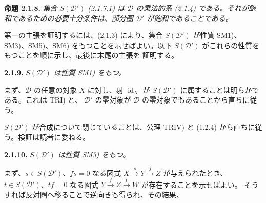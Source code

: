 \medskip
\noindent\textbf{命題 2.1.8.}\quad
{}
\emph{集合 $S(\mathcal D')$ (2.1.7.1) は $\mathcal D$ の乗法的系
(2.1.4) である。それが飽和であるための必要十分条件は、部分圏
$\mathcal D'$ が飽和であることである。}

第一の主張を証明するには、(2.1.3) により、集合 $S(\mathcal D')$ が性質
SM1)、SM3)、SM5)、SM6) をもつことを示せばよい。以下
$S(\mathcal D')$ がこれらの性質をもつことを順に示し、最後に末尾の主張を
証明する。

\medskip
\noindent\textbf{2.1.9.}\quad
{}
\emph{$S(\mathcal D')$ は性質 SM1) をもつ。}

まず、$\mathcal D$ の任意の対象 $X$ に対し、射 $\operatorname{id}_X$ が
$S(\mathcal D')$ に属することは明らかである。これは TRI) と、
$\mathcal D'$ の零対象が $\mathcal D$ の零対象でもあることから直ちに従う。

$S(\mathcal D')$ が合成について閉じていることは、公理 TRIV) と (1.2.4)
から直ちに従う。検証は読者に委ねる。

\medskip
\noindent\textbf{2.1.10.}\quad
{}
\emph{$S(\mathcal D')$ は性質 SM3) をもつ。}

まず、$s\in S(\mathcal D')$、$fs=0$ なる図式
$X\xrightarrow{s}Y\xrightarrow{f}Z$ が与えられたとき、
$t\in S(\mathcal D')$、$tf=0$ なる図式
$Y\xrightarrow{f}Z\xrightarrow{t}W$ が存在することを示せばよい。
そうすれば反対圏へ移ることで逆向きも得られ、その結果、

\endgroup
